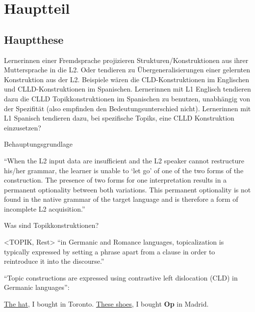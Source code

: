 \section{Hauptteil}

\subsection{Hauptthese}

Lernerinnen einer Fremdsprache projizieren Strukturen/Konstruktionen aus ihrer Muttersprache in die L2.
Oder tendieren zu Übergeneralisierungen einer gelernten Konstruktion aus der L2.
Beispiele wären die CLD-Konstruktionen im Englischen und CLLD-Konstruktionen im Spanischen.
Lernerinnen mit L1 Englisch tendieren dazu die CLLD Topikkonstruktionen im Spanischen zu benutzen, unabhängig von der Spezifität (also empfinden den Bedeutungsunterschied nicht).
Lernerinnen mit L1 Spanisch tendieren dazu, bei spezifische Topiks, eine CLLD Konstruktion einzusetzen?
\cite{Valenzuela05}


Behauptungsgrundlage


\cite{Valenzuela05}
``When the L2 input data are insufficient and the L2 speaker cannot restructure his/her grammar, the learner is unable to `let go' of
one of the two forms of the construction.
The presence of two forms for one interpretation results in a permanent optionality between both variations.
This permanent optionality is not found in the native grammar of the target language and is therefore a form of incomplete L2 acquisition.''

Was sind Topikkonstruktionen?

<TOPIK, Rest>
``in Germanic and Romance languages, topicalization is typically expressed by setting a phrase apart
from a clause in order to reintroduce it into the discourse.''

``Topic constructions are expressed using contrastive left dislocation (CLD) in Germanic languages'':
\begin{exe}
    \ex \uline{The hat}, I bought in Toronto.
    \ex \uline{These shoes}, I bought \textbf{Op} in Madrid.
\end{exe}

